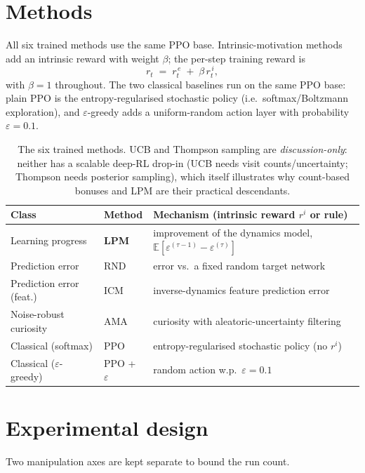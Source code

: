 \documentclass[11pt]{article}
\begin{document}
\section{Methods}
All six trained methods use the same PPO base. Intrinsic-motivation methods add an intrinsic reward
with weight \(\beta\); the per-step training reward is
\begin{equation}
  r_t \;=\; r_t^{\,e} \;+\; \beta\, r_t^{\,i},
  \label{eq:reward}
\end{equation}
with \(\beta=1\) throughout. The two classical baselines run on the same PPO base: plain PPO is the
entropy-regularised stochastic policy (i.e.\ softmax/Boltzmann exploration), and
\(\varepsilon\)-greedy adds a uniform-random action layer with probability \(\varepsilon=0.1\).

\begin{table}[h]
\centering
\begin{tabular}{@{}llp{6.4cm}@{}}
\toprule
\textbf{Class} & \textbf{Method} & \textbf{Mechanism (intrinsic reward \(r^{i}\) or rule)} \\
\midrule
Learning progress        & \textbf{LPM} & improvement of the dynamics model, \(\mathbb{E}\!\left[\varepsilon^{(\tau-1)}-\varepsilon^{(\tau)}\right]\) \\
Prediction error         & RND          & error vs.\ a fixed random target network \\
Prediction error (feat.) & ICM          & inverse-dynamics feature prediction error \\
Noise-robust curiosity   & AMA          & curiosity with aleatoric-uncertainty filtering \\
Classical (softmax)      & PPO          & entropy-regularised stochastic policy (no \(r^{i}\)) \\
Classical (\(\varepsilon\)-greedy) & PPO + \(\varepsilon\) & random action w.p.\ \(\varepsilon=0.1\) \\
\bottomrule
\end{tabular}
\caption{The six trained methods. UCB and Thompson sampling are \emph{discussion-only}: neither has
a scalable deep-RL drop-in (UCB needs visit counts/uncertainty; Thompson needs posterior sampling),
which itself illustrates why count-based bonuses and LPM are their practical descendants.}
\end{table}

\section{Experimental design}
Two manipulation axes are kept separate to bound the run count.
\end{document}
